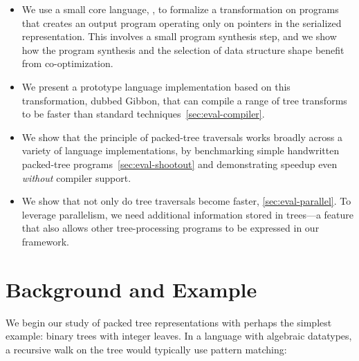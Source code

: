 \documentclass[a4paper,english]{lipics-v2016}
\newcommand{\treelang}{Gibbon\xspace} %
\begin{document}
\begin{itemize}
\item We use a small core language, \calculus{}, to formalize a transformation
  on programs that creates an output program operating only on
  pointers in the serialized representation.  This involves a small program
  synthesis step, and we show how the program synthesis and the selection of
  data structure shape benefit from co-optimization.
  
\item We present a prototype language implementation based on this
  transformation, dubbed \treelang, that can compile a range of tree transforms
  to be  faster than standard techniques~\cref{sec:eval-compiler}.
  
\item We show that the principle of packed-tree traversals works
  broadly across a variety of language implementations, by benchmarking simple
  handwritten packed-tree programs~\cref{sec:eval-shootout} and
  demonstrating speedup even \emph{without} compiler support.
  
\item We show that not only do tree traversals become faster, 
  \cref{sec:eval-parallel}. To leverage parallelism, we need
  additional information stored in trees---a feature that also allows
  other tree-processing programs to be expressed in our framework.
  
\end{itemize}


\section{Background and Example}

We begin our study of packed tree representations with perhaps the
simplest example: binary trees with
integer leaves.
%
In a language with algebraic datatypes,
a recursive walk on
the tree would typically use pattern matching:
\end{document}
